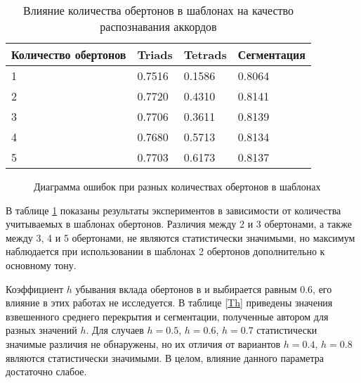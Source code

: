 \begin{table} [htbp]
  \centering
  \parbox{15cm}{\caption{Влияние количества обертонов в шаблонах на качество
  распознавания аккордов} \label{Tover}}
  \begin{tabular}{|l|l|l|l|}
  \hline
  Количество обертонов & Triads & Tetrads & Сегментация \\
  \hline
  1 & 0.7516 & 0.1586 & 0.8064 \\
  2 & 0.7720 & 0.4310 & 0.8141 \\
  3 & 0.7706 & 0.3611 & 0.8139 \\
  4 & 0.7680 & 0.5713 & 0.8134 \\
  5 & 0.7703 & 0.6173 & 0.8137 \\
  \hline
  \end{tabular}
\end{table}

\begin{figure}[h]
  \begin{minipage}[h]{0.49\linewidth}
  \end{minipage}
  \hfill
  \begin{minipage}[h]{0.49\linewidth}
  \end{minipage}
  \caption{Диаграмма ошибок при разных количествах обертонов в шаблонах}
  \label{img:nHarm}
\end{figure}

В таблице \ref{Tover} показаны результаты экспериментов в зависимости от
количества учитываемых в шаблонах обертонов. Различия между 2 и 3 обертонами, а
также между 3, 4 и 5 обертонами, не являются статистически значимыми, но
максимум наблюдается при использовании в шаблонах 2 обертонов дополнительно к
основному тону.

Коэффициент $h$ убывания вклада обертонов в \cite{Gomez2006} и \cite{Oudre2009}
выбирается равным 0.6, его влияние в этих работах не исследуется. В таблице
\ref{Th} приведены значения взвешенного среднего перекрытия и сегментации,
полученные автором для разных значений $h$. Для случаев $h=0.5$, $h=0.6$,
$h=0.7$ статистически значимые различия не обнаружены, но их отличия от
вариантов $h=0.4$, $h=0.8$ являются статистически значимыми. В целом, влияние
данного параметра достаточно слабое.

